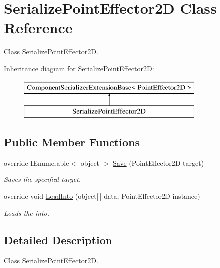 \hypertarget{class_serialize_point_effector2_d}{}\section{Serialize\+Point\+Effector2D Class Reference}
\label{class_serialize_point_effector2_d}


Class \hyperlink{class_serialize_point_effector2_d}{Serialize\+Point\+Effector2D}.  


Inheritance diagram for Serialize\+Point\+Effector2D\+:\begin{figure}[H]
\begin{center}
\leavevmode
\includegraphics[height=2.000000cm]{class_serialize_point_effector2_d}
\end{center}
\end{figure}
\subsection*{Public Member Functions}
\begin{DoxyCompactItemize}
\item 
override I\+Enumerable$<$ object $>$ \hyperlink{class_serialize_point_effector2_d_a013456d629025d927b70f26f3684d159}{Save} (Point\+Effector2D target)
\begin{DoxyCompactList}\small\item\em Saves the specified target. \end{DoxyCompactList}\item 
override void \hyperlink{class_serialize_point_effector2_d_a473636d957e184b107602f3f8c1c4b8d}{Load\+Into} (object\mbox{[}$\,$\mbox{]} data, Point\+Effector2D instance)
\begin{DoxyCompactList}\small\item\em Loads the into. \end{DoxyCompactList}\end{DoxyCompactItemize}


\subsection{Detailed Description}
Class \hyperlink{class_serialize_point_effector2_d}{Serialize\+Point\+Effector2D}. 



